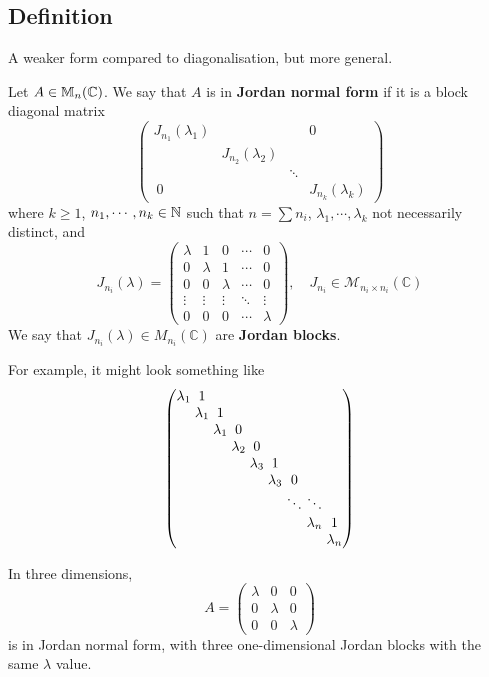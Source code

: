 \documentclass[a4paper]{article}
\begin{document}
\subsection{Definition}
A weaker form compared to diagonalisation, but more general. 
\begin{definition}
	Let \( A \in {\mathbb{M}}_n(\mathbb C) \).
	We say that \( A \) is in \textbf{Jordan normal form} if it is a block diagonal matrix
	\[
		\begin{pmatrix}
		  J_{n_1}(\lambda_1) & & & 0\\
		  & J_{n_2}(\lambda_2)\\
		  & & \ddots\\\
		  0 & & & J_{n_k} (\lambda_k)
		\end{pmatrix}
	\]
	where $k \geq 1$, $n_1, \cdots, n_k \in {\mathbb{N}}$ such that $n = \sum n_i$, $\lambda_1, \cdots, \lambda_k$ not necessarily distinct, and
	\[
		J_{n_i}(\lambda) =
		\begin{pmatrix}
			\lambda & 1       & 0       & \cdots & 0       \\
			0       & \lambda & 1       & \cdots & 0       \\
			0       & 0       & \lambda & \cdots & 0       \\
			\vdots  & \vdots  & \vdots  & \ddots & \vdots  \\
			0       & 0       & 0       & \cdots & \lambda
		\end{pmatrix},\quad J_{n_i}\in \mathcal{M}_{n_i\times n_i}(\mathbb{C})
	\]
	We say that \( J_{n_i}(\lambda) \in M_{n_i}(\mathbb C) \) are \textbf{Jordan blocks}.
\end{definition}
For example, it might look something like
\[\arraycolsep=1.4pt
  \begin{pmatrix}
    \lambda_1 & 1\\
    & \lambda_1 & 1\\
    & & \lambda_1 & 0\\
    & & & \lambda_2 & 0\\
    & & & & \lambda_3 & 1\\
    & & & & & \lambda_3 & 0\\
    & & & & & & \ddots & \ddots\\
    & & & & & & & \lambda_n & 1\\
    & & & & & & & & \lambda_n
  \end{pmatrix}
\]
\begin{remark}
	In three dimensions,
	\[
		A =
		\begin{pmatrix}
			\lambda & 0       & 0       \\
			0       & \lambda & 0       \\
			0       & 0       & \lambda
		\end{pmatrix}
	\]
	is in Jordan normal form, with three one-dimensional Jordan blocks with the same \( \lambda \) value.
\end{remark}
\end{document}
